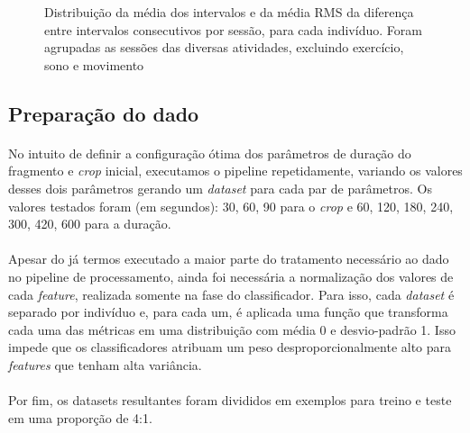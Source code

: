             \begin{figure}[h!]
                \centering
                \caption{Distribuição da média dos intervalos e da média RMS da diferença entre intervalos consecutivos por sessão, para cada indivíduo. Foram agrupadas as sessões das diversas atividades, excluindo exercício, sono e movimento}
                \label{sess_box_all}
            \end{figure}

        \subsection{Preparação do dado}
        
            \paragraph{} No intuito de definir a configuração ótima dos parâmetros de duração do fragmento e \textit{crop} inicial, executamos o pipeline repetidamente, variando os valores desses dois parâmetros gerando um \textit{dataset} para cada par de parâmetros. Os valores testados foram (em segundos): 30, 60, 90 para o \textit{crop} e 60, 120, 180, 240, 300, 420, 600 para a duração.
        
            \paragraph{} Apesar do já termos executado a maior parte do tratamento necessário ao dado no pipeline de processamento, ainda foi necessária a normalização dos valores de cada \textit{feature}, realizada somente na fase do classificador. Para isso, cada \textit{dataset} é separado por indivíduo e, para cada um, é aplicada uma função que transforma cada uma das métricas em uma distribuição com média 0 e desvio-padrão 1. Isso impede que os classificadores atribuam um peso desproporcionalmente alto para \textit{features} que tenham alta variância.
            
            \paragraph{} Por fim, os datasets resultantes foram divididos em exemplos para treino e teste em uma proporção de 4:1. 

